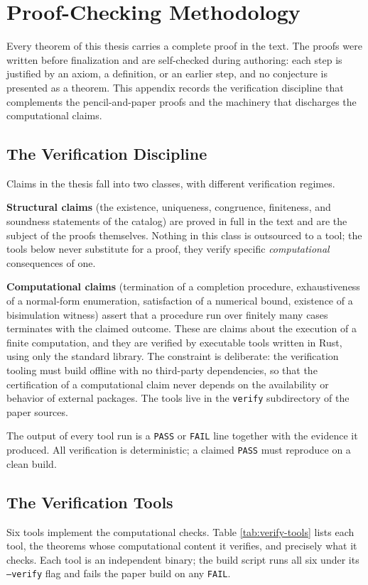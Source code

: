 \chapter{Proof-Checking Methodology}\label{app:a}

Every theorem of this thesis carries a complete proof in the text. The proofs were written before finalization and are self-checked during authoring: each step is justified by an axiom, a definition, or an earlier step, and no conjecture is presented as a theorem. This appendix records the verification discipline that complements the pencil-and-paper proofs and the machinery that discharges the computational claims.

\section{The Verification Discipline}
Claims in the thesis fall into two classes, with different verification regimes.

\textbf{Structural claims} (the existence, uniqueness, congruence, finiteness, and soundness statements of the catalog) are proved in full in the text and are the subject of the proofs themselves. Nothing in this class is outsourced to a tool; the tools below never substitute for a proof, they verify specific \emph{computational} consequences of one.

\textbf{Computational claims} (termination of a completion procedure, exhaustiveness of a normal-form enumeration, satisfaction of a numerical bound, existence of a bisimulation witness) assert that a procedure run over finitely many cases terminates with the claimed outcome. These are claims about the execution of a finite computation, and they are verified by executable tools written in Rust, using only the standard library. The constraint is deliberate: the verification tooling must build offline with no third-party dependencies, so that the certification of a computational claim never depends on the availability or behavior of external packages. The tools live in the \texttt{verify} subdirectory of the paper sources.

The output of every tool run is a \texttt{PASS} or \texttt{FAIL} line together with the evidence it produced. All verification is deterministic; a claimed \texttt{PASS} must reproduce on a clean build.

\section{The Verification Tools}
Six tools implement the computational checks. Table \ref{tab:verify-tools} lists each tool, the theorems whose computational content it verifies, and precisely what it checks. Each tool is an independent binary; the build script runs all six under its \texttt{--verify} flag and fails the paper build on any \texttt{FAIL}.

